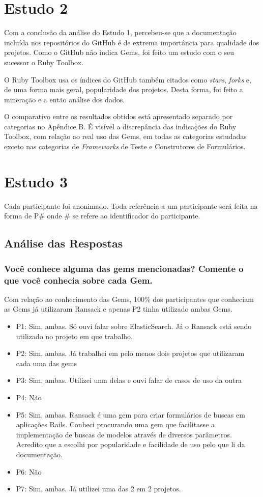 \section{Estudo 2}

Com a conclusão da análise do Estudo 1, percebeu-se que a documentação incluída nos repositórios do GitHub é de extrema importância para qualidade dos projetos. Como o GitHub não indica Gems, foi feito um estudo com o seu sucessor o Ruby Toolbox.

O Ruby Toolbox usa os índices do GitHub também citados como \textit{stars}, \textit{forks} e, de uma forma mais geral, popularidade dos projetos. Desta forma, foi feito a mineração e a então análise dos dados.

O comparativo entre os resultados obtidos está apresentado separado por categorias no Apêndice B. É visível a discrepância das indicações do Ruby Toolbox, com relação ao real uso das Gems, em todas as categorias estudadas exceto nas categorias de \textit{Frameworks} de Teste e Construtores de Formulários.

\section{Estudo 3}

Cada participante foi anonimado. Toda referência a um participante será feita na forma de P\# onde \# se refere ao identificador do participante.

\subsection{Análise das Respostas}

\subsubsection{Você conhece alguma das gems mencionadas? Comente o que você conhecia sobre cada Gem.}

Com relação ao conhecimento das Gems, 100\% dos participantes que conheciam as Gems já utilizaram Ransack e apenas P2 tinha utilizado ambas Gems.

\begin{itemize}
  \item P1: Sim, ambas. Só ouvi falar sobre ElasticSearch. Já o Ransack está sendo utilizado no projeto em que trabalho.
  \item P2: Sim, ambas. Já trabalhei em pelo menos dois projetos que utilizaram cada uma das gems
  \item P3: Sim, ambas. Utilizei uma delas e ouvi falar de casos de uso da outra
  \item P4: Não
  \item P5: Sim, ambas. Ransack é uma gem para criar formulários de buscas em aplicações Rails. Conheci procurando uma gem que facilitasse a implementação de buscas de modelos através de diversos parâmetros. Acredito que a escolhi por popularidade e facilidade de uso pelo que li da documentação.
  \item P6: Não
  \item P7: Sim, ambas. Já utilizei uma das 2 em 2 projetos.
\end{itemize}

